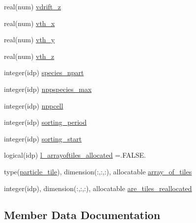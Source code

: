 \begin{DoxyCompactItemize}
real(num) \hyperlink{structparticle__speciesmodule_1_1particle__species_abe947e62e9f02647421983bab36fd3b4}{vdrift\+\_\+z}
\item 
real(num) \hyperlink{structparticle__speciesmodule_1_1particle__species_a0aac3d8c006510865b01a1c92f12518d}{vth\+\_\+x}
\item 
real(num) \hyperlink{structparticle__speciesmodule_1_1particle__species_a24a2e879d8fabf97d081e857e2307781}{vth\+\_\+y}
\item 
real(num) \hyperlink{structparticle__speciesmodule_1_1particle__species_aaa81b5d65f657ac14030dc1b173f2c3f}{vth\+\_\+z}
\item 
integer(idp) \hyperlink{structparticle__speciesmodule_1_1particle__species_a76ebc6a561029fa9850569bde01428be}{species\+\_\+npart}
\item 
integer(idp) \hyperlink{structparticle__speciesmodule_1_1particle__species_ae60b4ef189f4777fcbd38c8fa083b6a5}{nppspecies\+\_\+max}
\item 
integer(idp) \hyperlink{structparticle__speciesmodule_1_1particle__species_a85d9fbe02cbe094dd5d45b29e5a5cb52}{nppcell}
\item 
integer(idp) \hyperlink{structparticle__speciesmodule_1_1particle__species_a4bb668ad609f86bc2e0832a79d262f76}{sorting\+\_\+period}
\item 
integer(idp) \hyperlink{structparticle__speciesmodule_1_1particle__species_a28962e064910019368a651104e5104c1}{sorting\+\_\+start}
\item 
logical(idp) \hyperlink{structparticle__speciesmodule_1_1particle__species_a7ba3dd839d9ff39e9c2a8b7151d93e3c}{l\+\_\+arrayoftiles\+\_\+allocated} =.F\+A\+L\+S\+E.
\item 
type(\hyperlink{structparticle__tilemodule_1_1particle__tile}{particle\+\_\+tile}), dimension(\+:,\+:,\+:), allocatable \hyperlink{structparticle__speciesmodule_1_1particle__species_adf3862efae3787dab97df9f9064b65d9}{array\+\_\+of\+\_\+tiles}
\item 
integer(idp), dimension(\+:,\+:,\+:), allocatable \hyperlink{structparticle__speciesmodule_1_1particle__species_acfd22fe918c6c278d3e6cd7d4ae1d6f9}{are\+\_\+tiles\+\_\+reallocated}
\end{DoxyCompactItemize}


\subsection{Member Data Documentation}

